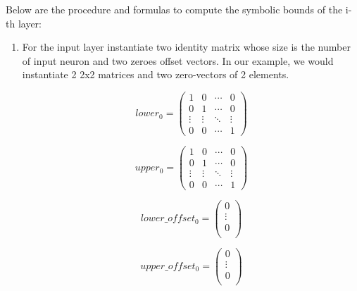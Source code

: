 Below are the procedure and formulas to compute the symbolic bounds of the i-th layer:
\begin{enumerate}
    \item For the input layer instantiate two identity matrix whose size is the number of input neuron and two zeroes offset vectors. In our example, we would instantiate 2 2x2 matrices and two zero-vectors of 2 elements.

        \begin{equation*}
            lower_0 = \begin{pmatrix}
            1 & 0 & \cdots & 0 \\
            0 & 1 & \cdots & 0 \\
            \vdots & \vdots & \ddots & \vdots \\
            0 & 0 & \cdots & 1
            \end{pmatrix}
        \end{equation*}
        
        \begin{equation*}
            upper_0 = \begin{pmatrix}
            1 & 0 & \cdots & 0 \\
            0 & 1 & \cdots & 0 \\
            \vdots & \vdots & \ddots & \vdots \\
            0 & 0 & \cdots & 1
            \end{pmatrix}
        \end{equation*}

        \begin{equation*}
            lower\_offset_0 = \begin{pmatrix}
            0  \\
            \vdots \\
            0  \\
            \end{pmatrix}
        \end{equation*}

        \begin{equation*}
            upper\_offset_0 = \begin{pmatrix}
            0  \\
            \vdots \\
            0  \\
            \end{pmatrix}
        \end{equation*}
        

\end{enumerate}
